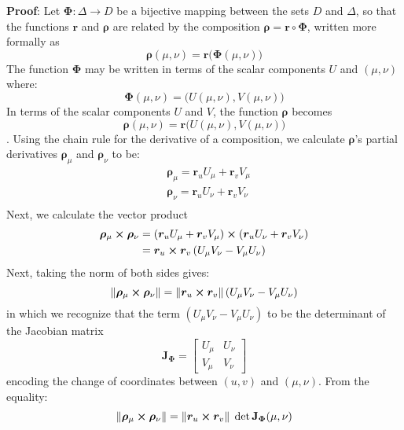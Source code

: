 \documentclass[11pt, a4paper]{article}
\begin{document}
\textbf{Proof}: 
Let $ \bm{\Phi} : \Delta \rightarrow D $ be a bijective mapping between the sets $ D $ and $ \Delta $, so that the functions $ \bm{r} $ and $ \bm{\rho} $ are related by the composition $ \bm{\rho} = \bm{r} \circ \bm{\Phi} $, written more formally as
\begin{equation*}
	\bm{\rho}(\mu, \nu) = \bm{r} \big( \bm{\Phi}(\mu, \nu) \big) 
\end{equation*}
The function $ \bm{\Phi} $ may be written in terms of the scalar components $ U $ and $ (\mu, \nu)  $ where:
\begin{equation*}
	\bm{\Phi} (\mu, \nu) = \big ( U(\mu, \nu) , V(\mu, \nu)  \big)
\end{equation*}
In terms of the scalar components $ U $ and $ V $, the function $ \bm{\rho} $ becomes
\begin{equation*}
	\bm{\rho}(\mu, \nu) = \bm{r} \big(  U(\mu, \nu),  V(\mu, \nu) \big) 
\end{equation*}.
Using the chain rule for the derivative of a composition, we calculate $ \bm{\rho} $'s partial derivatives $ \bm{\rho}_\mu $ and $ \bm{\rho}_\nu $ to be:
\begin{align*}
	&\bm{\rho}_\mu = \bm{r}_u U_\mu + \bm{r}_v V_\mu\\
	&\bm{\rho}_\nu = \bm{r}_u U_\nu + \bm{r}_v V_\nu\\
\end{align*}
Next, we calculate the vector product
\begin{align*}
	\bm{\rho}_\mu \cross \bm{\rho}_\nu & = \left(\bm{r}_u U_\mu + \bm{r}_v V_\mu\right) \cross \left( \bm{r}_u U_\nu + \bm{r}_v V_\nu\right)\\
	& = \bm{r}_u \cross \bm{r}_v \left(U_\mu V_\nu - V_\mu U_\nu \right) 
\end{align*}
Next, taking the norm of both sides gives:
\begin{equation*}
	\norm{\bm{\rho}_\mu \cross \bm{\rho}_\nu } = \norm{\bm{r}_u \cross \bm{r}_v} \left(U_\mu V_\nu - V_\mu U_\nu \right) 
\end{equation*}
in which we recognize that the term $ \left(U_\mu V_\nu - V_\mu U_\nu \right) $ to be the determinant of the Jacobian matrix 
\[\mathbf{J}_{\bm{\Phi}} = 
\begin{bmatrix}
	U_\mu & U_\nu \\
	V_\mu & V_\nu
\end{bmatrix}	
\]
encoding the change of coordinates between $ (u, v) $ and $ (\mu, \nu) $. From the equality:
\begin{equation*}
	\norm{\bm{\rho}_\mu \cross \bm{\rho}_\nu } = \norm{\bm{r}_u \cross \bm{r}_v} \; \det \mathbf{J}_{\bm{\Phi}}(\mu, \nu)
\end{equation*}
\end{document}
